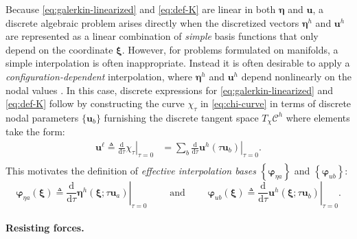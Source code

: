Because \eqref{eq:galerkin-linearized} and \eqref{eq:def-K} are linear in both
\(\bm{\eta}\) and \(\bm{u}\), a discrete algebraic problem
arises directly when the discretized vectors \(\bm{\eta}^h\) and \(\bm{u}^h\)
are represented as a linear combination of \emph{simple} basis functions
that only depend
on the coordinate \(\bm{\xi}\).
However, for problems formulated on manifolds,
a simple interpolation is often inappropriate.
Instead it is often desirable to apply a \emph{configuration-dependent} interpolation, where
\(\bm{\eta}^h\) and \(\bm{u}^h\)
depend nonlinearly on the nodal values 
\citep{romero2004interpolation, cardona1988beam, simo1990stress}.
In this case, discrete expressions for \eqref{eq:galerkin-linearized} and
\eqref{eq:def-K} follow by constructing
the curve \(\chi_\tau\) in \eqref{eq:chi-curve}
in terms of discrete nodal parameters \(\{\bm{u}_b\}\)
furnishing the discrete tangent space \(T_\chi\mathscr{C}^h\) 
where elements take the form:
\begin{equation*}
\begin{aligned}
\bm{u}^\ell \triangleq \left.\frac{\mathrm{d}}{\mathrm{d}\tau} \chi_\tau \right|_{\tau=0} 
  &= \sum_b \left.\frac{\mathrm{d}}{\mathrm{d}\tau}\bm{u}^h(\tau \bm{u}_b)\right|_{\tau=0}. \\
\end{aligned}
\end{equation*}
This motivates the definition of \emph{effective interpolation bases}
\(\left\{\bm{\varphi}^{}_{\eta a}\right\}\) and
\(\left\{\bm{\varphi}^{}_{u b}\right\}\):
\begin{equation}
  \bm{\varphi}^{}_{\eta a}(\bm{\xi}) \triangleq \left.\frac{\mathrm{d}}{\mathrm{d}\tau}\bm{\eta}^h (\bm{\xi}; \tau\bm{u}_a)\right|_{\tau=0}
\qquad\text{ and }\qquad
  \bm{\varphi}^{}_{u b}(\bm{\xi}) \triangleq \left.\frac{\mathrm{d}}{\mathrm{d}\tau}\bm{u}^h(\bm{\xi}; \tau  \bm{u}^{}_b)\right|_{\tau=0}.
\label{eq:interp}
\end{equation}


\paragraph{Resisting forces.}

